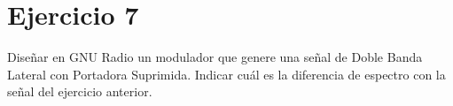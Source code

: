 \section{Ejercicio 7}

Diseñar en GNU Radio un modulador que genere una señal de Doble Banda Lateral con Portadora Suprimida. Indicar cuál es la diferencia de espectro con la señal del ejercicio anterior.
